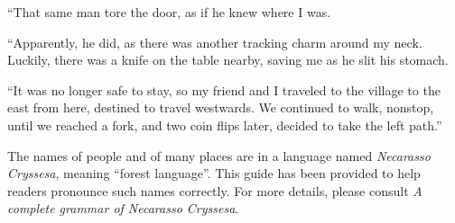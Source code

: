 ``That same man tore the door, as if he knew where I was.

``Apparently, he did, as there was another tracking charm around my neck. Luckily, there was a knife on the table nearby, saving me as he slit his stomach.

``It was no longer safe to stay, so my friend and I traveled to the village to the east from here, destined to travel westwards. We continued to walk, nonstop, until we reached a fork, and two coin flips later, decided to take the left path.''

\appendix
\showappendices


The names of people and of many places are in a language named \emph{Necarasso Cryssesa}, meaning ``forest language''. This guide has been provided to help readers pronounce such names correctly. For more details, please consult \emph{A complete grammar of Necarasso Cryssesa}.

